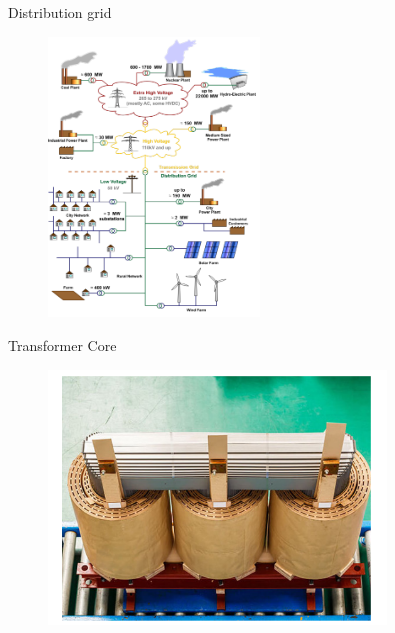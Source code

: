 \documentclass[aspectratio=43]{beamer}
\begin{document}
\begin{frame}[fragile]{Distribution grid} %
\begin{figure}
    \centering
    \includegraphics[width=0.5\textwidth]{figures/distribution grid.png}
    \label{fig:my_label3}
\end{figure}
\end{frame}

\begin{frame}[fragile]{Transformer Core} %
\begin{figure}
    \centering
    \includegraphics[width=0.8\textwidth]{figures/transformercore.png}
    \label{fig:my_label4}
\end{figure}
\end{frame}
\end{document}
